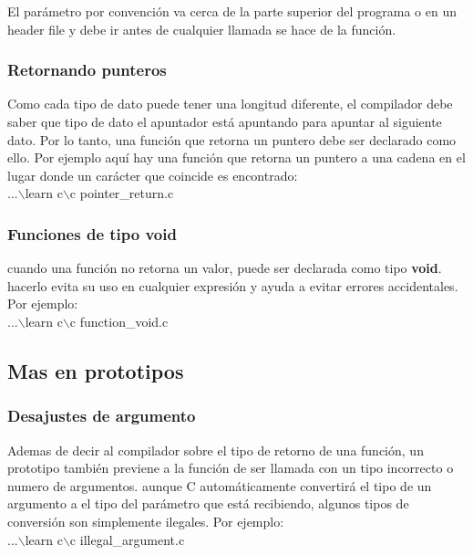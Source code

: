 \documentclass[]{article}
\begin{document}
	El parámetro por convención va cerca de la parte superior del programa o en un header file y debe ir antes de cualquier llamada se hace de la función.
	
	\subsubsection{Retornando punteros}
	
	Como cada tipo de dato puede tener una longitud diferente, el compilador debe saber que tipo de dato el apuntador está apuntando para apuntar al siguiente dato. Por lo tanto, una función que retorna un puntero debe ser declarado como ello. Por ejemplo aquí hay una función que retorna un puntero a una cadena en el lugar donde un carácter que coincide es encontrado:\\
	
	...$\backslash$learn c$\backslash$c pointer\_return.c\\
	
	\subsubsection{Funciones de tipo void}
	
	cuando una función no retorna un valor, puede ser declarada como tipo \textbf{void}. hacerlo evita su uso en cualquier expresión y ayuda a evitar errores accidentales. Por ejemplo:\\
	
	...$\backslash$learn c$\backslash$c function\_void.c\\
	
	\subsection{Mas en prototipos}
	
	\subsubsection{Desajustes de argumento}
	
	Ademas de decir al compilador sobre el tipo de retorno de una función, un prototipo  también previene a la función de ser llamada con un tipo incorrecto o numero de argumentos. aunque C automáticamente convertirá el tipo de un argumento a el tipo del parámetro que está recibiendo, algunos tipos de conversión son simplemente ilegales. Por ejemplo:\\
	
	...$\backslash$learn c$\backslash$c illegal\_argument.c\\
	
\end{document}
